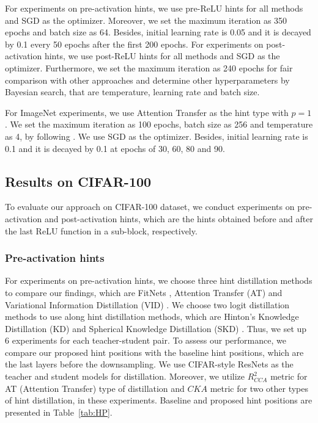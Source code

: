 \documentclass[final,3p,times]{elsarticle}
\begin{document}
For experiments on pre-activation hints, we use pre-ReLU hints for all methods and SGD as the optimizer. Moreover, we set the maximum iteration as 350 epochs and batch size as 64. Besides, initial learning rate is 0.05 and it is decayed by 0.1 every 50 epochs after the first 200 epochs. For experiments on post-activation hints, we use post-ReLU hints for all methods and SGD as the optimizer. Furthermore, we set the maximum iteration as 240 epochs for fair comparison with other approaches and determine other hyperparameters by Bayesian search, that are temperature, learning rate and batch size.

For ImageNet experiments, we use Attention Transfer as the hint type with $p=1$ \citep{Zagoruyko2017AT}. We set the maximum iteration as 100 epochs, batch size as 256 and temperature as 4, by following \citep{tian2019contrastive}. We use SGD as the optimizer. Besides, initial learning rate is 0.1 and it is decayed by 0.1 at epochs of 30, 60, 80 and 90.

\subsection{Results on CIFAR-100}

To evaluate our approach on CIFAR-100 dataset, we conduct experiments on pre-activation and post-activation hints, which are the hints obtained before and after the last ReLU function in a sub-block, respectively. 

\subsubsection{Pre-activation hints}

For experiments on pre-activation hints, we choose three hint distillation methods to compare our findings, which are FitNets \citep{romero2015fitnets}, Attention Transfer (AT) \citep{Zagoruyko2017AT} and Variational Information Distillation (VID) \citep{ahn2019variational}. We choose two logit distillation methods to use along hint distillation methods, which are Hinton's Knowledge Distillation (KD) \citep{hinton2015distilling} and Spherical Knowledge Distillation (SKD) \citep{guo2020spherical}. Thus, we set up 6 experiments for each teacher-student pair. To assess our performance, we compare our proposed hint positions with the baseline hint positions, which are the last layers before the downsampling. We use CIFAR-style ResNets as the teacher and student models for distillation. Moreover, we utilize $R^2_{CCA}$ metric for AT (Attention Transfer) type of distillation and $CKA$ metric for two other types of hint distillation, in these experiments. Baseline and proposed hint positions are presented in Table~\ref{tab:HP}.
\end{document}
